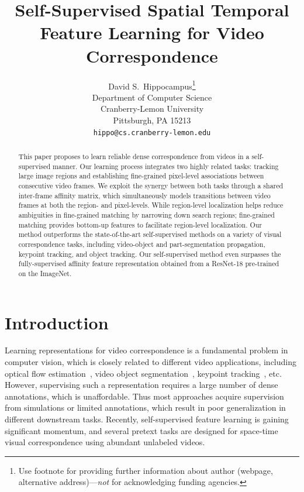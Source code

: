 \documentclass{article}
\title{Self-Supervised Spatial Temporal Feature Learning for Video Correspondence}
\author{%
  David S.~Hippocampus\thanks{Use footnote for providing further information
    about author (webpage, alternative address)---\emph{not} for acknowledging
    funding agencies.} \\
  Department of Computer Science\\
  Cranberry-Lemon University\\
  Pittsburgh, PA 15213 \\
  \texttt{hippo@cs.cranberry-lemon.edu} \\
}
\begin{document}
\maketitle


\begin{abstract}
  This paper proposes to learn reliable dense correspondence from videos in a self-supervised manner. Our learning process integrates two highly related tasks: tracking large image regions and establishing fine-grained pixel-level associations between consecutive video frames. We exploit the synergy between both tasks through a shared inter-frame affinity matrix, which simultaneously models transitions between video frames at both the region- and pixel-levels. While region-level localization helps reduce ambiguities in fine-grained matching by narrowing down search regions; fine-grained matching provides bottom-up features to facilitate region-level localization. Our method outperforms the state-of-the-art self-supervised methods on a variety of visual correspondence tasks, including video-object and part-segmentation propagation, keypoint tracking, and object tracking. Our self-supervised method even surpasses the fully-supervised affinity feature representation obtained from a ResNet-18 pre-trained on the ImageNet.
\end{abstract}



\section{Introduction}
Learning representations for video correspondence is a fundamental problem in computer vision, which is closely related to different video applications, including optical flow estimation~\cite{dosovitskiy2015flownet}\cite{horn1981determining}, video object segmentation~\cite{caelles2017one}\cite{oh2019video}, keypoint tracking~\cite{xiu2018pose}, etc. However, supervising such a representation requires a large number of dense annotations, which is unaffordable. Thus most approaches acquire supervision from simulations or limited annotations, which result in poor generalization in different downstream tasks. Recently, self-supervised feature learning is gaining significant momentum, and several pretext tasks are designed for space-time visual correspondence using abundant unlabeled videos. 
\end{document}
